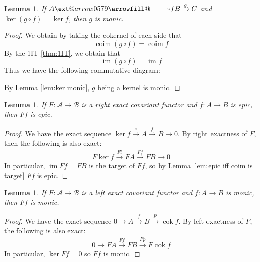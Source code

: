 \documentclass{article}
\makeatletter
\newcommand{\fA}{\mathscr{A}}
\newcommand{\fB}{\mathscr{B}}
\DeclareMathOperator{\im}{\mathrm{im}}
\DeclareMathOperator{\coim}{\mathrm{coim}}
\DeclareMathOperator{\cok}{\mathrm{cok}}
\newcommand\xtwoheadrightarrow[2][]{%
  \ext@arrow 0579{\twoheadrightarrowfill@}{#1}{#2}}
\newcommand\twoheadrightarrowfill@{%
  \arrowfill@\relbar\relbar\twoheadrightarrow}
\newtheorem{lemma}[theorem]{Lemma}
\makeatother
\begin{document}
\begin{lemma}\label{lem:comp with epic and ker}
    If $A\xtwoheadrightarrow{f}B\xrightarrow{g} C$ and $\ker(g\circ f)=\ker f$, then $g$ is monic.
\end{lemma}
\begin{proof}
    We obtain by taking the cokernel of each side that
    \[
    \coim (g\circ f)=\coim f
    \]
    By the 1IT \ref{thm:1IT}, we obtain that
    \[
    \im (g\circ f)=\im f
    \]
    Thus we have the following commutative diagram:
    \begin{center}
    \end{center}
    By Lemma \ref{lem:ker monic}, $g$ being a kernel is monic.
\end{proof}
\begin{lemma}\label{lem:covariant right exact preserves epic}
    If $F:\fA \to \fB$ is a right exact covariant functor and $f:A\to B$ is epic, then $Ff$ is epic.
\end{lemma}
\begin{proof}
    We have the exact sequence $\ker f \xrightarrow{i} A \xrightarrow{f}B \rightarrow0 $. By right exactness of $F$, then the following is also exact:
    \begin{align*}
        F\ker f \xrightarrow{Fi} FA \xrightarrow{Ff} FB \rightarrow 0
    \end{align*}
    In particular, $\im Ff=FB$ is the target of $Ff$, so by Lemma \ref{lem:epic iff coim is target} $Ff$ is epic.
\end{proof}
\begin{lemma}\label{lem:covariant left exact preserves monic}
    If $F:\fA \to \fB$ is a left exact covariant functor and $f:A\to B$ is monic, then $Ff$ is monic.
\end{lemma}
\begin{proof}
    We have the exact sequence $0\rightarrow A \xrightarrow{f}B\xrightarrow{p}\cok f$. By left exactness of $F$, the following is also exact:
    \begin{align*}
        0\rightarrow FA \xrightarrow{Ff} FB \xrightarrow{Fp} F\cok f
    \end{align*}
    In particular, $\ker Ff=0$ so $Ff$ is monic.
\end{proof}
\end{document}
